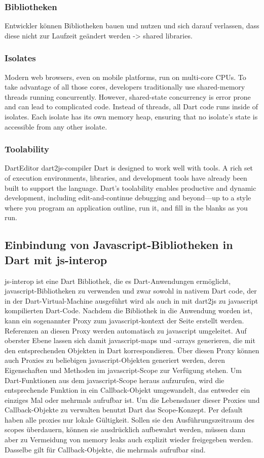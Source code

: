 \subsubsection{Bibliotheken}
Entwickler können Bibliotheken bauen und nutzen und sich darauf verlassen, dass diese nicht zur Laufzeit geändert werden -> shared libraries.
\subsubsection{Isolates}

Modern web browsers, even on mobile platforms, run on multi-core CPUs. To take advantage of all those cores, developers traditionally use shared-memory threads running concurrently. However, shared-state concurrency is error prone and can lead to complicated code. Instead of threads, all Dart code runs inside of isolates. Each isolate has its own memory heap, ensuring that no isolate’s state is accessible from any other isolate.
\subsubsection{Toolability}
DartEditor
dart2js-compiler
Dart is designed to work well with tools. A rich set of execution environments, libraries, and development tools have already been built to support the language. Dart's toolability enables productive and dynamic development, including edit-and-continue debugging and beyond—up to a style where you program an application outline, run it, and fill in the blanks as you run.

\subsection{Einbindung von Javascript-Bibliotheken in Dart mit js-interop}\label{s.Einbindung von Javascript-Bibliotheken in Dart mit js-interop}
js-interop ist eine Dart Bibliothek, die es Dart-Anwendungen ermöglicht, javascript-Bibliotheken zu verwenden und zwar sowohl in nativem Dart code, der in der Dart-Virtual-Machine ausgeführt wird als auch in mit dart2js zu javascript kompilierten Dart-Code.
Nachdem die Bibliothek in die Anwendung worden ist, kann ein sogenannter Proxy zum javascript-kontext der Seite erstellt werden. Referenzen an diesen Proxy werden automatisch zu javascript umgeleitet. Auf oberster Ebene lassen sich damit javascript-maps und -arrays generieren, die mit den entsprechenden Objekten in Dart korrespondieren.
Über diesen Proxy können auch Proxies zu beliebigen javascript-Objekten generiert werden, deren Eigenschaften und Methoden im javascript-Scope zur Verfügung stehen.
Um Dart-Funktionen aus dem javascript-Scope heraus aufzurufen, wird die entsprechende Funktion in ein Callback-Objekt umgewandelt, das entweder ein einziges Mal oder mehrmals aufrufbar ist.
Um die Lebensdauer dieser Proxies und Callback-Objekte zu verwalten benutzt Dart das Scope-Konzept.
Per default haben alle proxies nur lokale Gültigkeit. Sollen sie den Ausführungszeitraum des scopes überdauern, können sie ausdrücklich aufbewahrt werden, müssen dann aber zu Vermeidung von memory leaks auch explizit wieder freigegeben werden. Dasselbe gilt für Callback-Objekte, die mehrmals aufrufbar sind.


